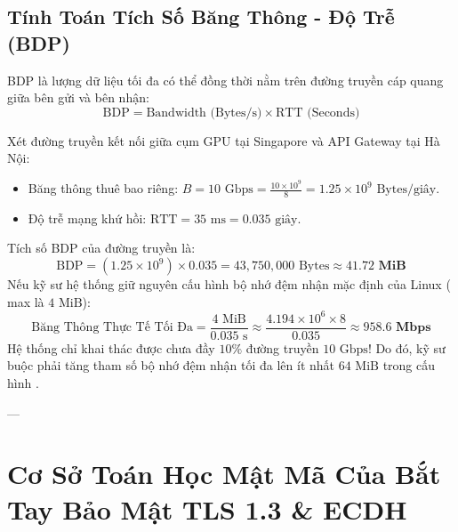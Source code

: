 \subsection{Tính Toán Tích Số Băng Thông - Độ Trễ (BDP)}

\begin{definition}
BDP là lượng dữ liệu tối đa có thể đồng thời nằm trên đường truyền cáp quang giữa bên gửi và bên nhận:
\begin{equation}
\text{BDP} = \text{Bandwidth (Bytes/s)} \times \text{RTT (Seconds)}
\end{equation}
\end{definition}

\begin{example}
Xét đường truyền kết nối giữa cụm GPU tại Singapore và API Gateway tại Hà Nội:
\begin{itemize}
  \item Băng thông thuê bao riêng: $B = 10\text{ Gbps} = \frac{10 \times 10^9}{8} = 1.25 \times 10^9\text{ Bytes/giây}$.
  \item Độ trễ mạng khứ hồi: $\text{RTT} = 35\text{ ms} = 0.035\text{ giây}$.
\end{itemize}
Tích số BDP của đường truyền là:
\begin{equation*}
\text{BDP} = (1.25 \times 10^9) \times 0.035 = 43,750,000\text{ Bytes} \approx \mathbf{41.72\text{ MiB}}
\end{equation*}
Nếu kỹ sư hệ thống giữ nguyên cấu hình bộ nhớ đệm nhận mặc định của Linux ( max là $4\text{ MiB}$):
\begin{equation*}
\text{Băng Thông Thực Tế Tối Đa} = \frac{4\text{ MiB}}{0.035\text{ s}} \approx \frac{4.194 \times 10^6 \times 8}{0.035} \approx \mathbf{958.6\text{ Mbps}}
\end{equation*}
Hệ thống chỉ khai thác được chưa đầy $10\%$ đường truyền $10\text{ Gbps}$! Do đó, kỹ sư buộc phải tăng tham số bộ nhớ đệm nhận  tối đa lên ít nhất $64\text{ MiB}$ trong cấu hình .
\end{example}

---

\section{Cơ Sở Toán Học Mật Mã Của Bắt Tay Bảo Mật TLS 1.3 \& ECDH}
\label{sec:tls13-ecdh-mathematics}

